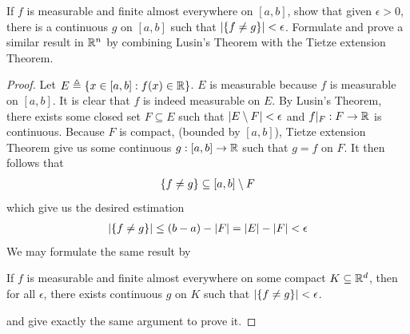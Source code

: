 \documentclass{report}
\begin{document}
\begin{question}{}{}
  If $f$ is measurable and finite almost everywhere on $[a,b]$, show that given $\epsilon >0$, there is a continuous $g$ on $[a,b]$ such that $\left|\{ f\neq g \}\right|< \epsilon $. Formulate and prove a similar result in $\mathbb{R}^n$ by combining Lusin's Theorem with the Tietze extension Theorem. 
\end{question}
\begin{proof}
Let $E\triangleq \{ x\in [a,b]:f(x)\in\mathbb{R} \}$. $E$ is measurable because  $f$ is measurable on $[a,b]$. It is clear that $f$ is indeed measurable on $E$. By Lusin's Theorem, there exists some closed set $F\subseteq E$ such that  $\left|E\setminus F\right|<\epsilon $ and $f|_F:F\rightarrow \mathbb{R}$ is continuous. Because $F$ is compact,  (bounded by $[a,b]$), Tietze extension Theorem give us some continuous $g:[a,b]\rightarrow \mathbb{R}$ such that  $g=f$ on $F$. It then follows that 
\begin{align*}
\{ f\neq g \}\subseteq [a,b]\setminus F
\end{align*}
which give us the desired estimation 
\begin{align*}
\left|\{ f\neq g \}\right|\leq (b-a)-\left|F\right|=\left|E\right|-\left|F\right|<\epsilon 
\end{align*}
We may formulate the same result by 
\begin{center}
   \begin{minipage}{0.9\linewidth}  
       \centering
       If $f$ is measurable and finite almost everywhere on some compact $K \subseteq \mathbb{R}^d$, then for all $\epsilon $, there exists continuous $g$ on  $K$ such that  $\left|\{ f\neq g \}\right|<\epsilon $. 
   \end{minipage}
\end{center}
and give exactly the same argument to prove it. 
\end{proof}
\end{document}
